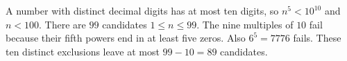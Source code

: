 A number with distinct decimal digits has at most ten digits, so $n^5<10^{10}$ and $n<100$. There are $99$ candidates $1\le n\le99$. The nine multiples of $10$ fail because their fifth powers end in at least five zeros. Also $6^5=7776$ fails. These ten distinct exclusions leave at most $99-10=\boxed{89}$ candidates.
